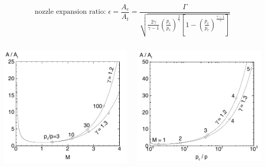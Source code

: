 \documentclass[
  ignorenonframetext,
]{beamer}
\begin{document}
\begin{frame}
\[ \text{nozzle expansion ratio: } \epsilon = \frac{A_e}{A_t} = \frac{\Gamma}{\sqrt{\frac{2\gamma}{\gamma-1} \left(\frac{p_e}{p_c}\right)^\frac{2}{\gamma} \left[1 - \left(\frac{p_e}{p_c}\right)^\frac{\gamma-1}{\gamma}\right]}}\]

\begin{columns}[T]
\begin{column}{0.5\textwidth}
\includegraphics{figs/fig.3.4l.png}
\end{column}

\begin{column}{0.5\textwidth}
\includegraphics{figs/fig.3.5l.png}
\end{column}
\end{columns}
\end{frame}
\end{document}
